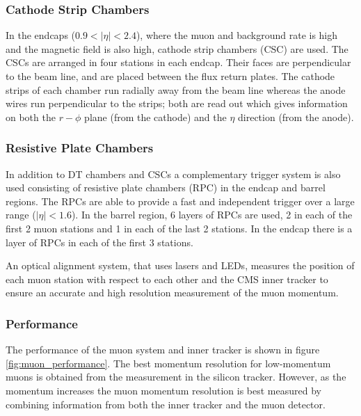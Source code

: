 \subsubsection{Cathode Strip Chambers}
In the endcaps ($0.9<|\eta|<2.4$), where the muon and background rate is high and
the magnetic field is also high,
cathode strip chambers (CSC) are used. The
CSCs are arranged in four stations in each endcap. Their faces are perpendicular
to the beam line, and are placed between the flux return plates.  The cathode
strips of each chamber run radially away from the beam line whereas the anode
wires run perpendicular to the strips; both are read out which gives information
on both the $r-\phi$ plane (from the cathode) and the $\eta$ direction (from the
anode). \cite{chatrchyan2008cms}

\subsubsection{Resistive Plate Chambers}
In addition to DT chambers and CSCs a complementary trigger system is also used
consisting of resistive plate chambers (RPC) in the endcap and barrel regions.
The RPCs are able to provide a fast and independent trigger over a large range
($|\eta| < 1.6$). In the barrel region, 6 layers of RPCs are used, 2 in each of
the first 2 muon stations and 1 in each of the last 2 stations. In the endcap
there is a layer of RPCs in each of the first 3 stations.

An optical alignment system, that uses lasers and LEDs, measures the position
of each muon station with respect to each other and the CMS inner tracker to
ensure an accurate and high resolution measurement of the muon
momentum.\cite{chatrchyan2008cms}

\subsubsection{Performance}
The performance of the muon system and inner tracker is shown in figure
\ref{fig:muon_performance}. The best momentum resolution for low-momentum muons
is obtained from the measurement in the silicon tracker. However, as the momentum
increases the muon momentum resolution is best measured by combining information
from both the inner tracker and the muon detector.

